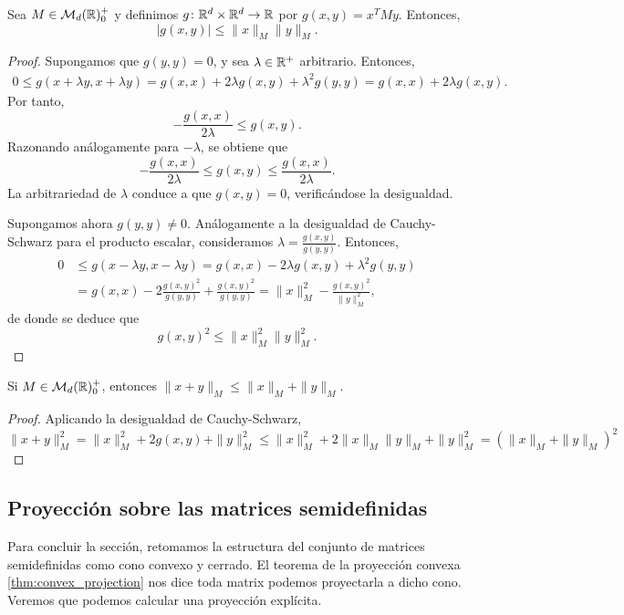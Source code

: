 \begin{thm} \label{thm:cauchy_schwarz}
    Sea $M \in \mathcal{M}_d(\mathbb{R})^+_0$ y definimos $g \colon \mathbb{R}^d \times \mathbb{R}^d \to \mathbb{R}$ por $g(x,y) = x^TMy$. Entonces,
    \[ |g(x,y)| \le \|x\|_M\|y\|_M. \]
\end{thm}
\begin{proof}
    Supongamos que $g(y,y)=0$, y sea $\lambda \in \mathbb{R}^+$ arbitrario. Entonces,
    \begin{align*}
        0 \le g(x + \lambda y, x+\lambda y) = g(x,x) + 2\lambda g(x,y) + \lambda^2 g(y,y) = g(x,x) + 2\lambda g(x,y).
    \end{align*}
    Por tanto,
    \[ - \frac{g(x,x)}{2\lambda} \le g(x,y). \]
    Razonando análogamente para $-\lambda$, se obtiene que
    \[ - \frac{g(x,x)}{2\lambda} \le g(x,y) \le \frac{g(x,x)}{2\lambda}.\]
    La arbitrariedad de $\lambda$ conduce a que $g(x,y)=0$, verificándose la desigualdad.

    Supongamos ahora $g(y,y) \ne 0$. Análogamente a la desigualdad de Cauchy-Schwarz para el producto escalar, consideramos $\lambda = \frac{g(x,y)}{g(y,y)}$. Entonces,
    \begin{align*}
        0 &\le g(x - \lambda y, x - \lambda y) = g(x,x) - 2\lambda g(x,y) + \lambda^2g(y,y) \\
          &= g(x,x) - 2 \frac{g(x,y)^2}{g(y,y)}+\frac{g(x,y)^2}{g(y,y)} = \|x\|_M^2 - \frac{g(x,y)^2}{\|y\|_M^2},
    \end{align*}
    de donde se deduce que
    \[ g(x,y)^2 \le \|x\|_M^2\|y\|_M^2. \]
\end{proof}

\begin{cor}
    Si $M \in \mathcal{M}_d(\mathbb{R})^+_0$, entonces $\|x+y\|_M \le \|x\|_M + \|y\|_M$.
\end{cor}
\begin{proof}
    Aplicando la desigualdad de Cauchy-Schwarz,
    \[ \|x+y\|^2_M = \|x\|^2_M + 2g(x,y) + \|y\|_M^2 \le \|x\|^2_M + 2\|x\|_M\|y\|_M + \|y\|^2_M = (\|x\|_M + \|y\|_M)^2 \]
\end{proof}

\subsection{Proyección sobre las matrices semidefinidas}

Para concluir la sección, retomamos la estructura del conjunto de matrices semidefinidas como cono convexo y cerrado. El teorema de la proyección convexa \ref{thm:convex_projection} nos dice toda matrix podemos proyectarla a dicho cono. Veremos que podemos calcular una proyección explícita.

